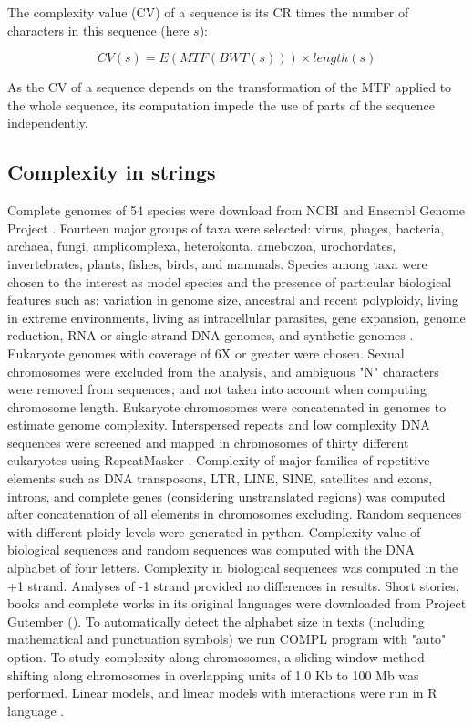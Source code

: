 The complexity value (CV) of a sequence is its CR times the number of
characters in this sequence (here $s$):

\begin{equation} \label{eq:cv}
CV(s) = E(MTF(BWT(s))) \times length(s)
\end{equation}

As the CV of a sequence depends on the transformation of the MTF applied to the whole sequence, its computation impede the use of parts of the sequence independently.

\subsection{Complexity in strings}
\label{sec:complexity-strings}

Complete genomes of 54 species were download from NCBI and Ensembl Genome Project \cite{Flicek2011}. Fourteen major groups of taxa were selected: virus, phages, bacteria, archaea, fungi, amplicomplexa, heterokonta, amebozoa, urochordates, invertebrates, plants, fishes, birds, and mammals. Species among taxa were chosen to the interest as model species and the presence of particular biological features such as: variation in genome size, ancestral and recent polyploidy, living in extreme environments, living as intracellular parasites, gene expansion, genome reduction, RNA or single-strand DNA genomes, and synthetic genomes . Eukaryote genomes with coverage of 6X or greater were chosen. Sexual chromosomes were excluded from the analysis, and ambiguous "N" characters were removed from sequences, and not taken into account when computing chromosome length. Eukaryote chromosomes were concatenated in genomes to estimate genome complexity. Interspersed repeats and low complexity DNA sequences were screened and mapped in chromosomes of thirty different eukaryotes using RepeatMasker \cite{Smit2010}. Complexity of major families of repetitive elements such as DNA transposons, LTR, LINE, SINE, satellites and exons, introns, and complete genes (considering unstranslated regions) was computed after concatenation of all elements in chromosomes excluding. Random sequences with different ploidy levels were generated in python. Complexity value of biological sequences and random sequences was computed with the DNA alphabet of four letters. Complexity in biological sequences was computed in the +1 strand. Analyses of -1 strand provided no differences in results. Short stories, books and complete works in its original languages were downloaded from Project Gutember (). To automatically detect the alphabet size in texts (including mathematical and punctuation symbols) we run COMPL program with "auto" option. To study complexity along chromosomes, a sliding window method shifting along chromosomes in overlapping units of 1.0 Kb to 100 Mb was performed. Linear models, and linear models with interactions were run in R language \cite{Team2008}.

